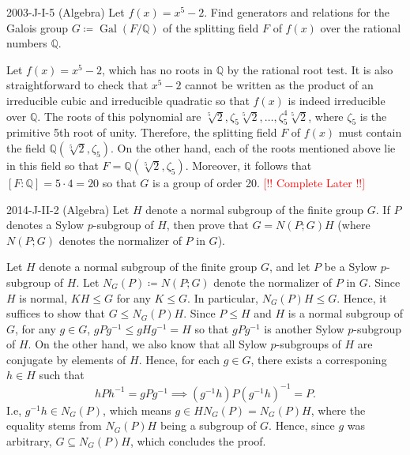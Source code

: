 \documentclass{article}
\begin{document}
\begin{prb}{2003-J-I-5 (Algebra)}
	Let $f(x) = x^{5} - 2$. Find generators and relations for the Galois group $G \coloneqq \operatorname{Gal}(F/\mathbb{Q})$ of the splitting field $F$ of $f(x)$ over the rational numbers $\mathbb{Q}$. 
\end{prb}
\begin{solutions}
	Let $f(x) = x^{5} - 2$, which has no roots in $\mathbb{Q}$ by the rational root test. It is also straightforward to check that $x^{5} - 2$ cannot be written as the product of an irreducible cubic and irreducible quadratic so that $f(x)$ is indeed irreducible over $\mathbb{Q}$. The roots of this polynomial are $\sqrt[5]{2}, \zeta_{5}\sqrt[5]{2}, \ldots, \zeta_{5}^{4}\sqrt[5]{2}$, where $\zeta_{5}$ is the primitive 5th root of unity. Therefore, the splitting field $F$ of $f(x)$ must contain the field $\mathbb{Q}(\sqrt[5]{2}, \zeta_{5})$. On the other hand, each of the roots mentioned above lie in this field so that $F = \mathbb{Q}(\sqrt[5]{2}, \zeta_{5})$. Moreover, it follows that $[F: \mathbb{Q}] = 5 \cdot 4 = 20$ so that $G$ is a group of order 20. \textcolor{red}{[!! Complete Later !!]}
\end{solutions}
\begin{prb}{2014-J-II-2 (Algebra)}
	Let $H$ denote a normal subgroup of the finite group $G$. If $P$ denotes a Sylow $p$-subgroup of $H$, then prove that $G= N(P;G)H$ (where $N(P;G)$ denotes the normalizer of $P$ in $G$). 
\end{prb}
\begin{solutions}
	Let $H$ denote a normal subgroup of the finite group $G$, and let $P$ be a Sylow $p$-subgroup of $H$. Let $N_{G}(P) \coloneqq N(P;G)$ denote the normalizer of $P$ in $G$. Since $H$ is normal, $KH \leq G$ for any $K \leq G$. In particular, $N_{G}(P)H \leq G$. Hence, it suffices to show that $G \leq N_{G}(P)H$. Since $P \leq H$ and $H$ is a normal subgroup of $G$, for any $g \in G$, $gPg^{-1} \leq gHg^{-1}= H$ so that $gPg^{-1}$ is another Sylow $p$-subgroup of $H$. On the other hand, we also know that all Sylow $p$-subgroups of $H$ are conjugate by elements of $H$. Hence, for each $g \in G$, there exists a corresponing $h \in H$ such that 
		\begin{equation}
			hPh^{-1} = gPg^{-1} \implies (g^{-1}h)P(g^{-1}h)^{-1} = P. 
		\end{equation}
	I.e, $g^{-1}h \in N_{G}(P)$, which means $g \in HN_{G}(P) = N_{G}(P)H$, where the equality stems from $N_{G}(P)H$ being a subgroup of $G$. Hence, since $g$ was arbitrary, $G \subseteq N_{G}(P)H$, which concludes the proof. 
\end{solutions}
\end{document}
